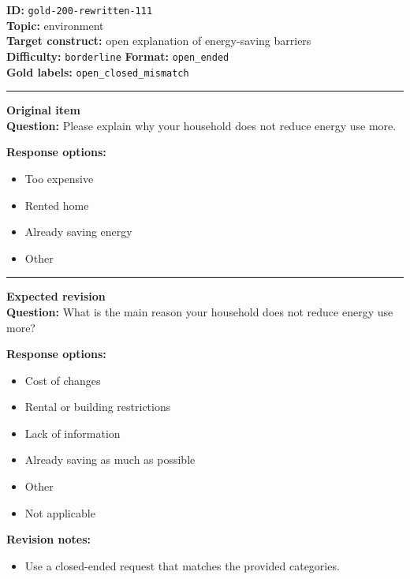 \documentclass[10pt,a4paper]{article}
\newcommand{\sectionline}{\vspace{0.15em}\hrule\vspace{0.35em}}
\begin{document}
\begin{tcolorbox}[colframe=FlawRed,colback=white,colbacktitle=FlawRed!9,coltitle=black,title={Item 111\hfill Flawed item}]
\textbf{ID:} \texttt{gold-200-rewritten-111}\\
\textbf{Topic:} environment\\
\textbf{Target construct:} open explanation of energy-saving barriers\\
\textbf{Difficulty:} \texttt{borderline} \quad \textbf{Format:} \texttt{open\_ended}\\
\textbf{Gold labels:} \texttt{open\_closed\_mismatch}\\
\sectionline
\textbf{Original item}\\
\textbf{Question:} Please explain why your household does not reduce energy use more.
\par\textbf{Response options:}
\begin{itemize}
\item Too expensive
\item Rented home
\item Already saving energy
\item Other
\end{itemize}
\sectionline
\textbf{Expected revision}\\
\textbf{Question:} What is the main reason your household does not reduce energy use more?
\par\textbf{Response options:}
\begin{itemize}
\item Cost of changes
\item Rental or building restrictions
\item Lack of information
\item Already saving as much as possible
\item Other
\item Not applicable
\end{itemize}
\par\textbf{Revision notes:}
\begin{itemize}
\item Use a closed-ended request that matches the provided categories.
\end{itemize}
\end{tcolorbox}
\end{document}
